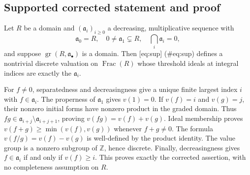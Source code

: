 \documentclass[10pt]{article}
\begin{document}
\subsection*{Supported corrected statement and proof}
Let \(R\) be a domain and \((\mathfrak a_i)_{i\geq0}\) a decreasing, multiplicative sequence with \[\mathfrak a_0=R,\quad 0\ne\mathfrak a_1\subsetneq R,\quad
 \bigcap_i\mathfrak a_i=0,\] and suppose \(\operatorname{gr}(R,\mathfrak a_\bullet)\) is a domain. Then [eq:sup] (\#eq:sup) defines a nontrivial discrete valuation on \(\operatorname{Frac}(R)\) whose threshold ideals at integral indices are exactly the \(\mathfrak a_i\).\par
For \(f\ne0\), separatedness and decreasingness give a unique finite largest index \(i\) with \(f\in\mathfrak a_i\). The properness of \(\mathfrak a_1\) gives \(v(1)=0\). If \(v(f)=i\) and \(v(g)=j\), their nonzero initial forms have nonzero product in the graded domain. Thus \(fg\in\mathfrak a_{i+j}\setminus\mathfrak a_{i+j+1}\), proving \(v(fg)=v(f)+v(g)\). Ideal membership proves \(v(f+g)\geq\min(v(f),v(g))\) whenever \(f+g\ne0\). The formula \(v(f/g)=v(f)-v(g)\) is well-defined by the product identity. The value group is a nonzero subgroup of \(\mathbb Z\), hence discrete. Finally, decreasingness gives \(f\in\mathfrak a_i\) if and only if \(v(f)\geq i\). This proves exactly the corrected assertion, with no completeness assumption on \(R\).\par
\end{document}
